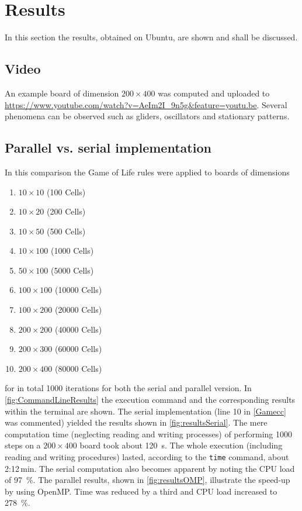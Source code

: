 \section{Results}\label{sec:results}
In this section the results, obtained on Ubuntu, are shown and shall be discussed.

\subsection{Video}
An example board of dimension $200\times 400$ was computed and uploaded to \url{https://www.youtube.com/watch?v=AeIm2I_9n5g&feature=youtu.be}. Several phenomena can be observed such as gliders, oscillators and stationary patterns.

\subsection{Parallel vs. serial implementation}
In this comparison the Game of Life rules were applied to boards of dimensions
\begin{multicols}{2}
	\begin{enumerate}[label=(\roman*),leftmargin=2cm]
		\item $10\times10$ (100 Cells)
		\item $10\times20$ (200 Cells)
		\item $10\times50$ (500 Cells)
		\item $10\times100$ (\num{1000} Cells)
		\item $50\times100$ (\num{5000} Cells)
		\item $100\times100$ (\num{10000} Cells)
		\item $100\times200$ (\num{20000} Cells)
		\item $200\times200$ (\num{40000} Cells)
		\item $200\times300$ (\num{60000} Cells)
		\item $200\times400$ (\num{80000} Cells)
	\end{enumerate}
\end{multicols}
for in total 1000 iterations for both the serial and parallel version. In \cref{fig:CommandLineResults} the execution command and the corresponding results within the terminal are shown. The serial implementation (line 10 in \cref{Gamecc} was commented) yielded the results shown in \cref{fig:resultsSerial}. The mere computation time (neglecting reading and writing processes) of performing 1000 steps on a $200\times400$ board took about \SI{120}{\second}. The whole execution (including reading and writing procedures) lasted, according to the \texttt{time} command, about 2:12\,min. The serial computation also becomes apparent by noting the CPU load of \SI{97}{\percent}.
The parallel results, shown in \cref{fig:resultsOMP}, illustrate the speed-up by using OpenMP. Time was reduced by a third and CPU load increased to \SI{278}{\percent}.

